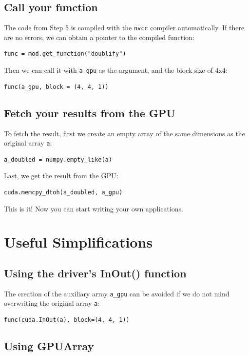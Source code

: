 \documentclass[article,A4,12pt]{llncs}
\begin{document}
\subsection{Call your function}

The code from Step 5 is compiled with the {\tt nvcc} compiler automatically. 
If there are no errors, we can obtain a pointer to the compiled function:

\begin{verbatim}
func = mod.get_function("doublify")
\end{verbatim}
Then we can call it with {\tt a\_gpu} as the argument, and the block size of 4x4:

\begin{verbatim}
func(a_gpu, block = (4, 4, 1))
\end{verbatim}

\subsection{Fetch your results from the GPU}

To fetch the result, first we create an empty array of the same dimensions
as the original array {\tt a}:
\begin{verbatim}
a_doubled = numpy.empty_like(a)
\end{verbatim}
Last, we get the result from the GPU:
\begin{verbatim}
cuda.memcpy_dtoh(a_doubled, a_gpu)
\end{verbatim}
This is it! Now you can start writing your own applications.

\section{Useful Simplifications}

\subsection{Using the driver's InOut() function}

The creation of the auxiliary array {\tt a\_gpu} can be avoided if we do not 
mind overwriting the original array {\tt a}:
\begin{verbatim}
func(cuda.InOut(a), block=(4, 4, 1))
\end{verbatim}

\subsection{Using GPUArray}
\end{document}
